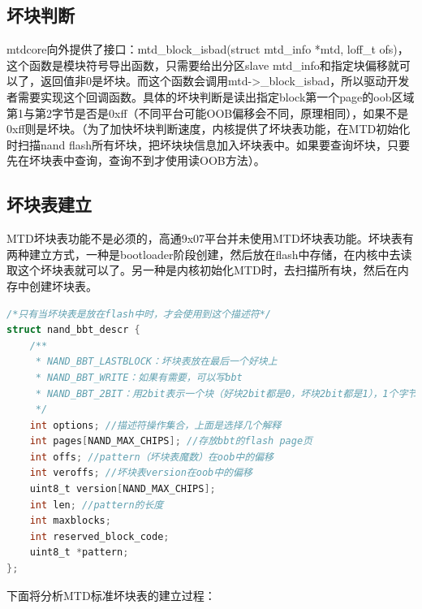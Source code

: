 \subsection{坏块判断}
mtdcore向外提供了接口：mtd\_block\_isbad(struct mtd\_info *mtd, loff\_t ofs)，这个函数是模块符号导出函数，只需要给出分区slave mtd\_info和指定块偏移就可以了，返回值非0是坏块。而这个函数会调用mtd->\_block\_isbad，所以驱动开发者需要实现这个回调函数。具体的坏块判断是读出指定block第一个page的oob区域第1与第2字节是否是0xff（不同平台可能OOB偏移会不同，原理相同），如果不是0xff则是坏块。（为了加快坏块判断速度，内核提供了坏块表功能，在MTD初始化时扫描nand flash所有坏块，把坏块块信息加入坏块表中。如果要查询坏块，只要先在坏块表中查询，查询不到才使用读OOB方法）。
\subsection{坏块表建立}
MTD坏块表功能不是必须的，高通9x07平台并未使用MTD坏块表功能。坏块表有两种建立方式，一种是bootloader阶段创建，然后放在flash中存储，在内核中去读取这个坏块表就可以了。另一种是内核初始化MTD时，去扫描所有块，然后在内存中创建坏块表。
\begin{lstlisting}[language=C]
/*只有当坏块表是放在flash中时，才会使用到这个描述符*/
struct nand_bbt_descr {
	/**
	 * NAND_BBT_LASTBLOCK：坏块表放在最后一个好块上
	 * NAND_BBT_WRITE：如果有需要，可以写bbt
	 * NAND_BBT_2BIT：用2bit表示一个块（好块2bit都是0，坏块2bit都是1），1个字节就能描述4个块
	 */
	int options; //描述符操作集合，上面是选择几个解释
	int pages[NAND_MAX_CHIPS]; //存放bbt的flash page页
	int offs; //pattern（坏块表魔数）在oob中的偏移
	int veroffs; //坏块表version在oob中的偏移
	uint8_t version[NAND_MAX_CHIPS];
	int len; //pattern的长度
	int maxblocks;
	int reserved_block_code;
	uint8_t *pattern;
};
\end{lstlisting}
下面将分析MTD标准坏块表的建立过程：
